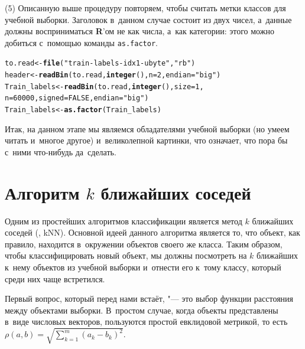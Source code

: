 \documentclass[final,pdftex]{../../template/epsilonj}\usepackage[]{graphicx}\usepackage[]{color}
\makeatletter
\newcommand{\hlnum}[1]{\textcolor[rgb]{0.686,0.059,0.569}{#1}}%
\newcommand{\hlstr}[1]{\textcolor[rgb]{0.192,0.494,0.8}{#1}}%
\newcommand{\hlstd}[1]{\textcolor[rgb]{0.345,0.345,0.345}{#1}}%
\newcommand{\hlkwb}[1]{\textcolor[rgb]{0.69,0.353,0.396}{#1}}%
\newcommand{\hlkwc}[1]{\textcolor[rgb]{0.333,0.667,0.333}{#1}}%
\newcommand{\hlkwd}[1]{\textcolor[rgb]{0.737,0.353,0.396}{\textbf{#1}}}%
\newenvironment{kframe}{%
 \def\at@end@of@kframe{}%
 \ifinner\ifhmode%
  \def\at@end@of@kframe{\end{minipage}}%
  \begin{minipage}{\columnwidth}%
 \fi\fi%
 \def\FrameCommand##1{\hskip\@totalleftmargin \hskip-\fboxsep
 \colorbox{shadecolor}{##1}\hskip-\fboxsep
     \hskip-\linewidth \hskip-\@totalleftmargin \hskip\columnwidth}%
 \MakeFramed {\advance\hsize-\width
   \@totalleftmargin\z@ \linewidth\hsize
   \@setminipage}}%
 {\par\unskip\endMakeFramed%
 \at@end@of@kframe}
\newenvironment{knitrout}{}{} %
\makeatother
\begin{document}
\par\medskip (5) Описанную выше процедуру повторяем, чтобы считать метки классов для учебной выборки. 
Заголовок в~данном случае состоит из двух чисел, а~данные должны восприниматься \textbf{R}'ом не как числа, а~как категории: этого можно добиться с~помощью команды \texttt{as.factor}.

\begin{knitrout}
\color{fgcolor}\begin{kframe}
\begin{alltt}
\hlstd{to.read} \hlkwb{<-} \hlkwd{file}\hlstd{(}\hlstr{"train-labels-idx1-ubyte"}\hlstd{,} \hlstr{"rb"}\hlstd{)}
\hlstd{header} \hlkwb{<-} \hlkwd{readBin}\hlstd{(to.read,} \hlkwd{integer}\hlstd{(),} \hlkwc{n}\hlstd{=}\hlnum{2}\hlstd{,} \hlkwc{endian}\hlstd{=}\hlstr{"big"}\hlstd{)}
\hlstd{Train_labels} \hlkwb{<-} \hlkwd{readBin}\hlstd{(to.read,} \hlkwd{integer}\hlstd{(),} \hlkwc{size} \hlstd{=} \hlnum{1}\hlstd{,}
            \hlkwc{n} \hlstd{=} \hlnum{60000}\hlstd{,} \hlkwc{signed} \hlstd{=} \hlnum{FALSE}\hlstd{,} \hlkwc{endian}\hlstd{=}\hlstr{"big"}\hlstd{)}
\hlstd{Train_labels} \hlkwb{<-} \hlkwd{as.factor}\hlstd{(Train_labels)}
\end{alltt}
\end{kframe}
\end{knitrout}

\par\medskip
Итак, на данном этапе мы являемся обладателями учебной выборки (но умеем читать и~многое другое) и~великолепной картинки, что означает, что пора бы с~ними что-нибудь да~сделать. 

\section{Алгоритм $k$ ближайших соседей}

Одним из простейших алгоритмов классификации является метод $k$ ближайших соседей (, kNN). 
Основной идеей данного алгоритма является то, что объект, как правило, находится в~окружении объектов своего же класса. 
Таким образом, чтобы классифицировать новый объект, мы должны посмотреть на $k$ ближайших к~нему объектов из учебной выборки и~отнести его к~тому классу, который среди них чаще встретился.

Первый вопрос, который перед нами встаёт, "--- это выбор функции расстояния между объектами выборки.
В~простом случае, когда объекты представлены в~виде числовых векторов, пользуются простой евклидовой метрикой, то есть $\rho(a, b) = \sqrt{\sum\limits_{k = 1}^m(a_k-b_k)^2}$.
\end{document}
